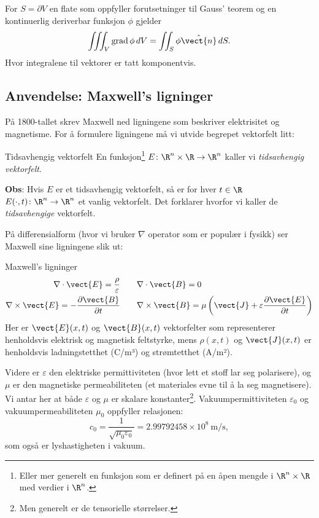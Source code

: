\begin{prop}\label{prop:gauss_grad}
    For $S=\partial V$ en flate som oppfyller forutsetninger til Gauss' teorem og en kontinuerlig deriverbar funksjon $\phi$ gjelder
    \[\iiint_V \mathrm{grad }\, \phi \, dV = \iint_S \phi \hat{\vect{n}}\, dS.\]
    Hvor integralene til vektorer er tatt komponentvis.
\end{prop}

%
\subsection{Anvendelse: Maxwell's ligninger}
På 1800-tallet skrev Maxwell ned ligningene som beskriver elektrisitet og magnetisme. 
For å formulere ligningene må vi utvide begrepet vektorfelt litt:

\begin{defn}{Tidsavhengig vektorfelt}
    En funksjon\footnote{Eller mer generelt en funksjon som er definert på en åpen mengde i $\R^n \times \R$ med verdier i $\R^n$.} $E \colon \R^n \times \R \rightarrow \R^n$ kaller vi \emph{tidsavhengig vektorfelt}.
\end{defn}
\textbf{Obs}: Hvis $E$ er et tidsavhengig vektorfelt, så er for hver $t \in \R$ $E(\cdot, t) \colon \R^n  \rightarrow \R^n$ et vanlig vektorfelt. 
Det forklarer hvorfor vi kaller de \emph{tidsavhengige} vektorfelt.

På differensialform (hvor vi bruker $\nabla$ operator som er populær i fysikk) ser Maxwell sine ligningene slik ut:
\begin{oppsum}{Maxwell's ligninger}
\begin{align}\label{max:divEB}
\nabla \cdot \vect{E} = \frac{\rho}{\varepsilon}  &\qquad \nabla \cdot \vect{B} = 0 \\
\nabla \times \vect{E} = -\frac{\partial \vect{B}}{\partial t} & \qquad \nabla \times \vect{B} = \mu \left( \vect{J} + \varepsilon \frac{\partial \vect{E}}{\partial t} \right) \label{max:PDE}
\end{align}
Her er \( \vect{E}(x, t) \) og \( \vect{B}(x, t) \) vektorfelter som representerer henholdsvis elektrisk og magnetisk feltstyrke, mens \( \rho(x, t) \) og \( \vect{J}(x, t) \) er henholdsvis ladningstetthet (C/m³) og strømtetthet (A/m²). 

Videre er \( \varepsilon \) den elektriske permittiviteten (hvor lett et stoff lar seg polarisere), og \( \mu \) er den magnetiske permeabiliteten (et materiales evne til å la seg magnetisere). Vi antar her at både \( \varepsilon \) og \( \mu \) er skalare konstanter\footnote{Men generelt er de tensorielle størrelser.}. Vakuumpermittiviteten \( \varepsilon_0 \) og vakuumpermeabiliteten \( \mu_0 \) oppfyller relasjonen:
\[
c_0 = \frac{1}{\sqrt{\mu_0 \varepsilon_0}} = 2.99792458 \times 10^8\ \text{m/s},
\]
som også er lyshastigheten i vakuum. 
\end{oppsum}

